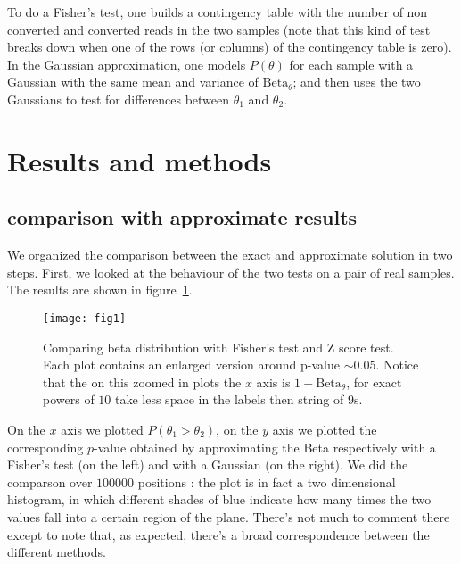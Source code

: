 \documentclass[11pt]{amsart}
\newcommand{\betapdf}{\mbox{Beta}_\theta}
\begin{document}
To do a Fisher's test, one builds a contingency table with the number of non converted and converted reads in the two samples (note that this kind of test breaks down when one of the rows (or columns) of the contingency table is zero). In the Gaussian approximation, one models $P(\theta)$ for each sample with a Gaussian with the same mean and variance of $\betapdf$; and then uses the two Gaussians to test for differences between $\theta_1$ and $\theta_2$. 
\section{Results and methods} 
\subsection{comparison with approximate results}
We organized the comparison between the exact and approximate solution in two steps. First,
we looked at the behaviour of the two tests on a pair of real samples. The results are shown in figure~\ref{cmpreal}.
\begin{figure}[h]
\caption{Comparing beta distribution with Fisher's test and Z score test. Each plot contains an enlarged version around p-value $\sim 0.05$. Notice that the on this zoomed in plots the $x$ axis is $1-\betapdf$, for exact powers of $10$ take less space in the labels then string of $9$s.}
\texttt{[image: fig1]}
\label{cmpreal}
\end{figure}
On the $x$ axis we plotted $P(\theta_1>\theta_2)$, on the $y$ axis we plotted the corresponding $p$-value obtained by approximating the Beta respectively with a Fisher's test (on the left) and with a Gaussian (on the right).
We did the comparson over $100000$ positions : the plot is in fact a two dimensional histogram, in which different shades of blue indicate how many times the two values fall into a certain region of the plane. There's not much to comment there except to note that, as expected, there's a broad correspondence between the different methods.
\end{document}
